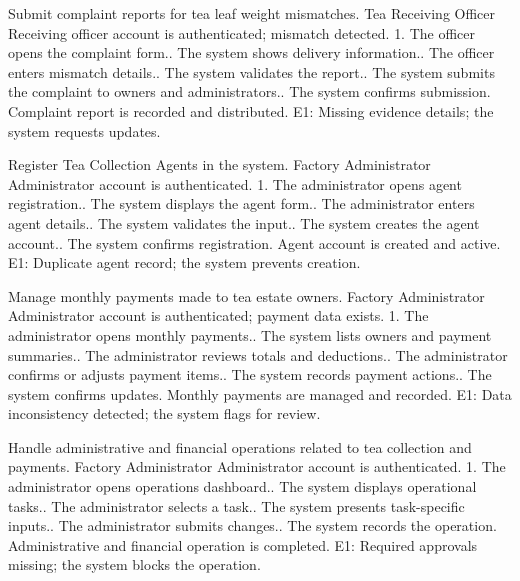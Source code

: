 {Submit complaint reports for tea leaf weight mismatches.}
{Tea Receiving Officer}
{Receiving officer account is authenticated; mismatch detected.}
{1. The officer opens the complaint form.. The system shows delivery information.. The officer enters mismatch details.. The system validates the report.. The system submits the complaint to owners and administrators.. The system confirms submission.}
{Complaint report is recorded and distributed.}
{E1: Missing evidence details; the system requests updates.}

{Register Tea Collection Agents in the system.}
{Factory Administrator}
{Administrator account is authenticated.}
{1. The administrator opens agent registration.. The system displays the agent form.. The administrator enters agent details.. The system validates the input.. The system creates the agent account.. The system confirms registration.}
{Agent account is created and active.}
{E1: Duplicate agent record; the system prevents creation.}

{Manage monthly payments made to tea estate owners.}
{Factory Administrator}
{Administrator account is authenticated; payment data exists.}
{1. The administrator opens monthly payments.. The system lists owners and payment summaries.. The administrator reviews totals and deductions.. The administrator confirms or adjusts payment items.. The system records payment actions.. The system confirms updates.}
{Monthly payments are managed and recorded.}
{E1: Data inconsistency detected; the system flags for review.}

{Handle administrative and financial operations related to tea collection and payments.}
{Factory Administrator}
{Administrator account is authenticated.}
{1. The administrator opens operations dashboard.. The system displays operational tasks.. The administrator selects a task.. The system presents task-specific inputs.. The administrator submits changes.. The system records the operation.}
{Administrative and financial operation is completed.}
{E1: Required approvals missing; the system blocks the operation.}

